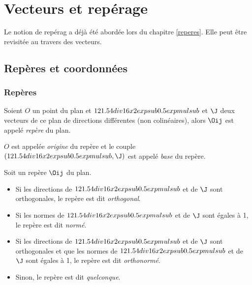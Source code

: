 \chapter{Vecteurs et rep\'erage} \label{vecreperes}
\minitoc

\fancyhead{}
\fancyfoot{} %
\fancyhead[LE,RO]{\footnotesize \em \rightmark}
    \fancyfoot[LE,RO]{\textbf{\thepage}}

Le notion de rep\'erag a d\'ej\`a \'et\'e abord\'ee lors du chapitre \ref{reperes}. Elle peut \^etre revisit\'ee au travers des vecteurs.

\section{Rep\`eres et coordonn\'ees}

\subsection{Rep\`eres}
\begin{definition}
 Soient $O$ un point du plan et $12 1.5 4 div 16 x 2 exp sub 0.5 exp mul sub$ et $\J$ deux vecteurs de ce plan de directions diff\'erentes (non colin\'eaires), alors $\Oij$ est appel\'e \emph{rep\`ere} du plan.
\end{definition}

\begin{rmq}
 $O$ est appel\'ee \emph{origine} du rep\`ere et le couple $\left(\I,\J\right)$ est appel\'e \emph{base} du rep\`ere.
\end{rmq}

\begin{definition}
 Soit un rep\`ere $\Oij$ du plan.
\begin{itemize}
 \item Si les directions de $12 1.5 4 div 16 x 2 exp sub 0.5 exp mul sub$ et de $\J$ sont orthogonales, le rep\`ere est dit \emph{orthogonal}.
 \item Si les normes de $12 1.5 4 div 16 x 2 exp sub 0.5 exp mul sub$ et de $\J$ sont \'egales \`a 1, le rep\`ere est dit \emph{norm\'e}.
 \item Si les directions de $12 1.5 4 div 16 x 2 exp sub 0.5 exp mul sub$ et de $\J$ sont orthogonales et que les normes de $12 1.5 4 div 16 x 2 exp sub 0.5 exp mul sub$ et de $\J$ sont \'egales \`a 1, le rep\`ere est dit \emph{orthonorm\'e}.
 \item Sinon, le rep\`ere est dit \emph{quelconque}.
\end{itemize}
\end{definition}


